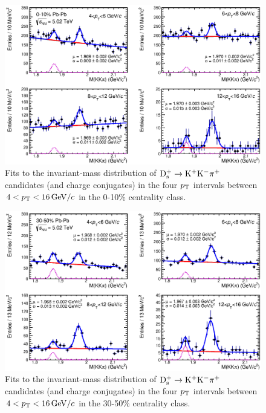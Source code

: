  
\begin{figure}[!h]
 \begin{center}
  \includegraphics[width=.9\textwidth]{FigCap5/DsMassHistos_010.eps}
\end{center}
 \caption{Fits to the invariant-mass distribution of ${\rm D^{+}_\mathrm{s}\to K^+ K^-\pi^+}$ candidates (and charge conjugates) in the four $p_{\rm T}$ intervals between $4 < p_{\rm T} < 16 \, \mathrm{GeV}/c$ in the 0-10\% centrality class. }
 \label{fig:FigInvMassDs_pbpb010} 
\end{figure} 
\begin{figure}[!h]
 \begin{center}
  \includegraphics[width=.9\textwidth]{FigCap5/DsMassHistos_3050.eps}
\end{center}
 \caption{Fits to the invariant-mass distribution of ${\rm D^{+}_\mathrm{s}\to K^+ K^-\pi^+}$ candidates (and charge conjugates) in the four $p_{\rm T}$ intervals between $4 < p_{\rm T} < 16 \, \mathrm{GeV}/c$ in the 30-50\% centrality class. }
 \label{fig:FigInvMassDs_pbpb3050} 
\end{figure} 
